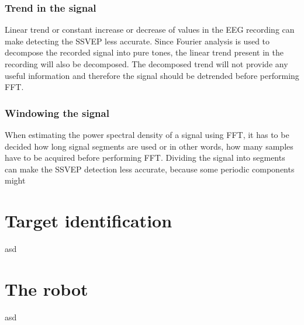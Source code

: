 \subsubsection{Trend in the signal}

Linear trend or constant increase or decrease of values in the \gls{EEG} recording can make detecting the \gls{SSVEP} less accurate. Since Fourier analysis is used to decompose the recorded signal into \glspl{pure tone}, the linear trend present in the recording will also be decomposed. The decomposed trend will not provide any useful information and therefore the signal should be detrended before performing \gls{FFT}.

\subsubsection{Windowing the signal}

When estimating the \gls{power spectral density} of a signal using \gls{FFT}, it has to be decided how long signal segments are used or in other words, how many samples have to be acquired before performing \gls{FFT}. Dividing the signal into segments can make the \gls{SSVEP} detection less accurate, because some periodic components might

\section{Target identification}
asd
\section{The robot}
asd